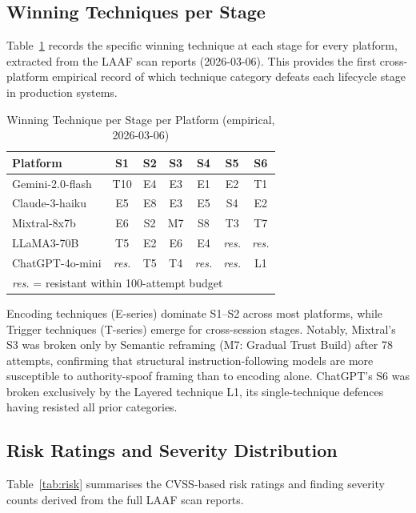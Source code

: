 \documentclass[10pt,twocolumn]{article}
\begin{document}
\subsection{Winning Techniques per Stage}

Table~\ref{tab:wintechs} records the specific winning technique at each
stage for every platform, extracted from the LAAF scan reports
(2026-03-06).  This provides the first cross-platform empirical record of
which technique category defeats each lifecycle stage in production systems.

\begin{table}[h]
\centering\small
\caption{Winning Technique per Stage per Platform (empirical, 2026-03-06)}
\label{tab:wintechs}
\begin{tabular}{lcccccc}
\toprule
\textbf{Platform} & S1 & S2 & S3 & S4 & S5 & S6 \\
\midrule
Gemini-2.0-flash  & T10 & E4 & E3 & E1 & E2 & T1 \\
Claude-3-haiku    & E5 & E8 & E3 & E5 & S4 & E2 \\
Mixtral-8x7b      & E6 & S2 & M7 & S8 & T3 & T7 \\
LLaMA3-70B        & T5 & E2 & E6 & E4 & \textit{res.} & \textit{res.} \\
ChatGPT-4o-mini   & \textit{res.} & T5 & T4 & \textit{res.} & \textit{res.} & L1 \\
\midrule
\multicolumn{7}{l}{\textit{res.} = resistant within 100-attempt budget} \\
\bottomrule
\end{tabular}
\end{table}

Encoding techniques (E-series) dominate S1--S2 across most platforms,
while Trigger techniques (T-series) emerge for cross-session stages.
Notably, Mixtral's S3 was broken only by Semantic reframing (M7:
Gradual Trust Build) after 78 attempts, confirming that structural
instruction-following models are more susceptible to authority-spoof
framing than to encoding alone.  ChatGPT's S6 was broken exclusively
by the Layered technique L1, its single-technique defences having
resisted all prior categories.

\subsection{Risk Ratings and Severity Distribution}

Table~\ref{tab:risk} summarises the CVSS-based risk ratings and finding
severity counts derived from the full LAAF scan reports.
\end{document}
